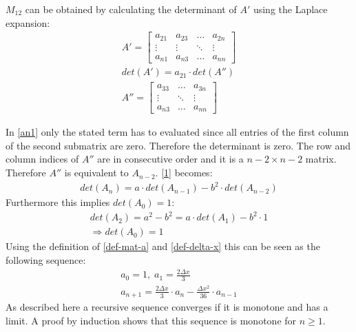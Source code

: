 \(M_{12}\) can be obtained by calculating the determinant of \(A'\) using the Laplace expansion:
\begin{gather}
A' = \begin{bmatrix}
a_{21} & a_{23} & \dots & a_{2n}\\
\vdots & \vdots & \ddots & \vdots \\
a_{n1} & a_{n3} & \dots & a_{nn}
\end{bmatrix} \\
det(A') = a_{21} \cdot det(A'') \label{an1} \\
A'' = \begin{bmatrix}
a_{33} & \dots & a_{3n}\\
\vdots & \ddots & \vdots \\
a_{n3} & \dots & a_{nn}
\end{bmatrix}
\end{gather}

In \ref{an1} only the stated term has to evaluated since all entries of the first column of the second submatrix are zero. 
Therefore the determinant is zero.
The row and column indices of \(A''\) are in consecutive order and it is a \(n-2 \times n-2\) matrix.
Therefore \(A''\) is equivalent to \(A_{n-2}\).
\ref{1} becomes:
\begin{gather}
det(A_n) = a \cdot det(A_{n-1}) - b^{2} \cdot det(A_{n-2})
\end{gather}
Furthermore this implies \(det(A_0) = 1\):
\begin{gather}
det(A_2) = a^{2} - b^{2} =  a \cdot det(A_1) - b^{2} \cdot 1 \\
\Rightarrow det(A_0) = 1
\end{gather}
Using the definition of \ref{def-mat-a} and \ref{def-delta-x} this can be seen as the following sequence:
\begin{gather}
a_0 = 1, \; a_1 = \frac{2 \Delta x}{3} \\
a_{n+1} = \frac{2 \Delta x}{3} \cdot a_{n} - \frac{\Delta x^2}{36} \cdot a_{n-1} 
\end{gather}
As described here \cite{Michael2017} a recursive sequence converges if it is monotone and has a limit.
A proof by induction shows that this sequence is monotone for \(n \geq 1\).


